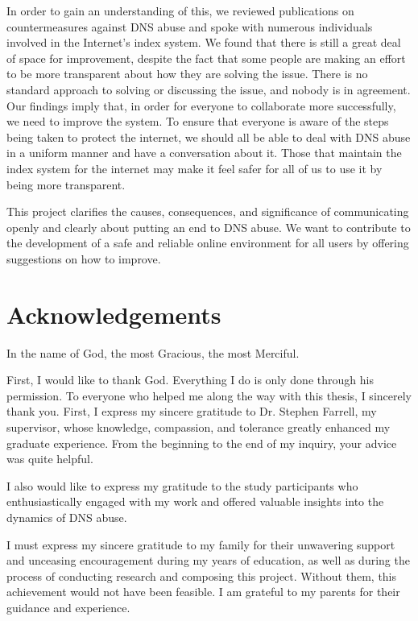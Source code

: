 \documentclass[a4paper,oneside,12pt]{book}
\numberwithin{equation}{chapter} %
\begin{document}
In order to gain an understanding of this, we reviewed publications on countermeasures against DNS abuse and spoke with numerous individuals involved in the Internet's index system. We found that there is still a great deal of space for improvement, despite the fact that some people are making an effort to be more transparent about how they are solving the issue. There is no standard approach to solving or discussing the issue, and nobody is in agreement. Our findings imply that, in order for everyone to collaborate more successfully, we need to improve the system. To ensure that everyone is aware of the steps being taken to protect the internet, we should all be able to deal with DNS abuse in a uniform manner and have a conversation about it. Those that maintain the index system for the internet may make it feel safer for all of us to use it by being more transparent.

This project clarifies the causes, consequences, and significance of communicating openly and clearly about putting an end to DNS abuse. We want to contribute to the development of a safe and reliable online environment for all users by offering suggestions on how to improve.



\newpage
\onehalfspacing\raggedright %

\section*{\Huge\textcolor{tcd_blue}{Acknowledgements}}

In the name of God, the most Gracious, the most Merciful.

First, I would like to thank God. Everything I do is only done through his permission. To everyone who helped me along the way with this thesis, I sincerely thank you. First, I express my sincere gratitude to Dr. Stephen Farrell, my supervisor, whose knowledge, compassion, and tolerance greatly enhanced my graduate experience. From the beginning to the end of my inquiry, your advice was quite helpful.

I also would like to express my gratitude to the study participants who enthusiastically engaged with my work and offered valuable insights into the dynamics of DNS abuse.

I must express my sincere gratitude to my family for their unwavering support and unceasing encouragement during my years of education, as well as during the process of conducting research and composing this project. Without them, this achievement would not have been feasible. I am grateful to my parents for their guidance and experience.
\end{document}
